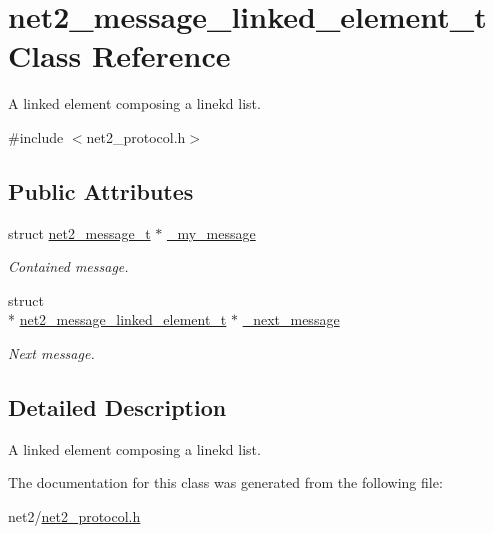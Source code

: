 \hypertarget{structnet2__message__linked__element__t}{\section{net2\-\_\-message\-\_\-linked\-\_\-element\-\_\-t Class Reference}
\label{structnet2__message__linked__element__t}
}


A linked element composing a linekd list.  




{\ttfamily \#include $<$net2\-\_\-protocol.\-h$>$}

\subsection*{Public Attributes}
\begin{DoxyCompactItemize}
\item 
\hypertarget{structnet2__message__linked__element__t_a6ef66e03a7c837615a5fc44d05e10da9}{struct \hyperlink{structnet2__message__t}{net2\-\_\-message\-\_\-t} $\ast$ \hyperlink{structnet2__message__linked__element__t_a6ef66e03a7c837615a5fc44d05e10da9}{\-\_\-my\-\_\-message}}\label{structnet2__message__linked__element__t_a6ef66e03a7c837615a5fc44d05e10da9}

\begin{DoxyCompactList}\small\item\em Contained message. \end{DoxyCompactList}\item 
\hypertarget{structnet2__message__linked__element__t_a4456c5695189635ab7db61a66a706e03}{struct \\*
\hyperlink{structnet2__message__linked__element__t}{net2\-\_\-message\-\_\-linked\-\_\-element\-\_\-t} $\ast$ \hyperlink{structnet2__message__linked__element__t_a4456c5695189635ab7db61a66a706e03}{\-\_\-next\-\_\-message}}\label{structnet2__message__linked__element__t_a4456c5695189635ab7db61a66a706e03}

\begin{DoxyCompactList}\small\item\em Next message. \end{DoxyCompactList}\end{DoxyCompactItemize}


\subsection{Detailed Description}
A linked element composing a linekd list. 

The documentation for this class was generated from the following file\-:\begin{DoxyCompactItemize}
\item 
net2/\hyperlink{net2__protocol_8h}{net2\-\_\-protocol.\-h}\end{DoxyCompactItemize}
